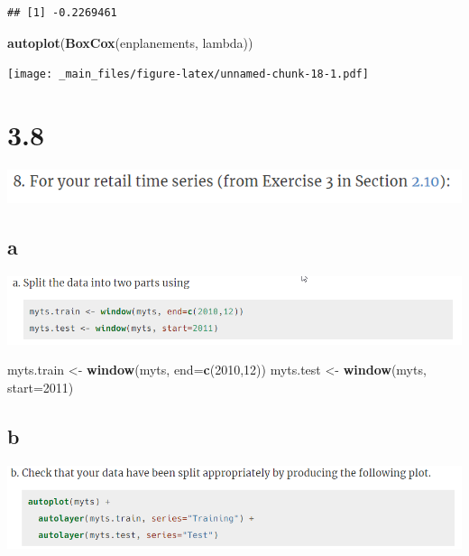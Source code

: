 \documentclass[]{book}
\newenvironment{Shaded}{\begin{snugshade}}{\end{snugshade}}
\newcommand{\DataTypeTok}[1]{\textcolor[rgb]{0.13,0.29,0.53}{#1}}
\newcommand{\DecValTok}[1]{\textcolor[rgb]{0.00,0.00,0.81}{#1}}
\newcommand{\KeywordTok}[1]{\textcolor[rgb]{0.13,0.29,0.53}{\textbf{#1}}}
\newcommand{\NormalTok}[1]{#1}
\newcommand{\StringTok}[1]{\textcolor[rgb]{0.31,0.60,0.02}{#1}}
\begin{document}
\begin{verbatim}
## [1] -0.2269461
\end{verbatim}

\begin{Shaded}
\begin{Highlighting}[]
\KeywordTok{autoplot}\NormalTok{(}\KeywordTok{BoxCox}\NormalTok{(enplanements, lambda))}
\end{Highlighting}
\end{Shaded}

\texttt{[image: \_main\_files/figure-latex/unnamed-chunk-18-1.pdf]}

\hypertarget{section-4}{%
\section{3.8}\label{section-4}}

\includegraphics{./week1/3.8.png}

\hypertarget{a-1}{%
\subsection{a}\label{a-1}}

\includegraphics{./week1/3.8a.png}

\begin{Shaded}
\begin{Highlighting}[]
\NormalTok{myts.train <-}\StringTok{ }\KeywordTok{window}\NormalTok{(myts, }\DataTypeTok{end=}\KeywordTok{c}\NormalTok{(}\DecValTok{2010}\NormalTok{,}\DecValTok{12}\NormalTok{))}
\NormalTok{myts.test <-}\StringTok{ }\KeywordTok{window}\NormalTok{(myts, }\DataTypeTok{start=}\DecValTok{2011}\NormalTok{)}
\end{Highlighting}
\end{Shaded}

\hypertarget{b-1}{%
\subsection{b}\label{b-1}}

\includegraphics{./week1/3.8b.png}
\end{document}
